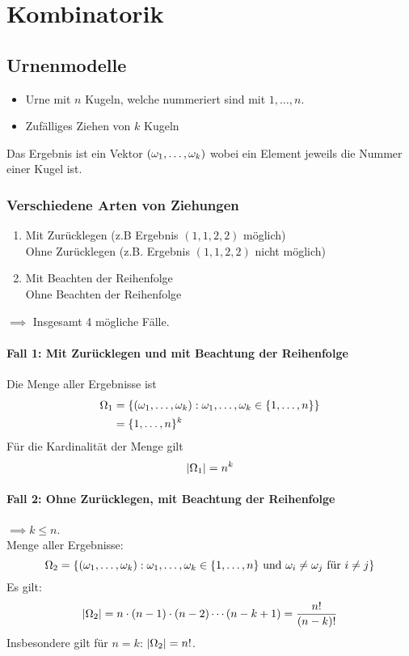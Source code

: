 \chapter{Kombinatorik}

\section{Urnenmodelle}
\begin{itemize}
    \item Urne mit $n$ Kugeln, welche nummeriert sind mit $1, \dots , n$.
    \item Zufälliges Ziehen von $k$ Kugeln
\end{itemize}
Das Ergebnis ist ein Vektor $(\omega_1,\dots , \omega_k)$ wobei ein Element jeweils die
Nummer einer Kugel ist.

\subsection{Verschiedene Arten von Ziehungen}
\begin{enumerate}
    \item Mit Zurücklegen (z.B Ergebnis $(1,1,2,2)$ möglich) \\
          Ohne Zurücklegen (z.B. Ergebnis $(1,1,2,2)$ nicht möglich)
    \item Mit Beachten der Reihenfolge\\
          Ohne Beachten der Reihenfolge
\end{enumerate}
$\implies$ Insgesamt 4 mögliche Fälle.

\subsubsection{Fall 1: Mit Zurücklegen und mit Beachtung der Reihenfolge}
Die Menge aller Ergebnisse ist
\begin{align*}
    \Omega_1 & = \{ (\omega_1, \dots ,\omega_k): \omega_1, \dots ,\omega_k \in \{1,\dots ,n\} \}\\
          & =\{ 1,\dots ,n \}^k
\end{align*}
Für die Kardinalität der Menge gilt
\begin{equation*}
    |\Omega_1| = n^k
\end{equation*}

\subsubsection{Fall 2: Ohne Zurücklegen, mit Beachtung der Reihenfolge}
$\implies k \leq n$.\\
Menge aller Ergebnisse:
\begin{equation*}
    \Omega_2 = \{ (\omega_1, \dots ,\omega_k): \omega_1, \dots ,\omega_k \in \{ 1, \dots ,n \} \text{ und } \omega_i \neq \omega_j \text{ für } i \neq j \}
\end{equation*}
Es gilt:
\begin{equation*}
    |\Omega_2| = n \cdot (n-1) \cdot (n-2) \cdots (n-k+1) = \frac{n!}{(n-k)!}
\end{equation*}
Insbesondere gilt für $n=k$: $|\Omega_2| = n!$.

